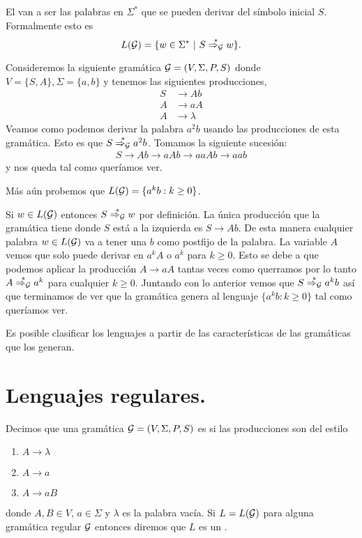 \documentclass[tesis.tex]{subfiles}
\newcommand{\gramatica}{{\cal G} = (V, \Sigma, P, S)}
\newcommand{\deriva}{\overset{*}{\Rightarrow_{\cal G}}}
\newcommand{\lengderivado}{L({\cal G})}
\begin{document}
\begin{deff}
	El  van a ser las palabras en $\Sigma^*$ que se pueden derivar del símbolo inicial $S$. Formalmente esto es
	\[
	L({\cal G}) = \{ w \in \Sigma^* \ | \ S \overset{*}{\Rightarrow_{\cal G}} w   \}.
	\]
\end{deff}
\medskip
\begin{ej}\label{gramatica-regular}
	Consideremos la siguiente gramática ${\cal G} = (V, \Sigma, P, S)$ donde $V = \{ S, A \}, \Sigma = \{ a,b \}$ y tenemos las siguientes producciones,
	\begin{align*}
	S & \to Ab \\
	A & \to aA \\
	A & \to \lambda
	\end{align*}
	Veamos como podemos derivar la palabra $a^2b$ usando las producciones de esta gramática. 
	Esto es que $S \deriva a^2b$.
	Tomamos la siguiente sucesión:
	\begin{align*}
		S \to Ab \to aAb \to aaAb \to aab
	\end{align*} 
	y nos queda tal como queríamos ver.
	
	Más aún probemos que $L({\cal G}) = \{ a^{k}b : k \ge 0 \}$. 
	
	Si $w \in L(\cal G)$ entonces $S \deriva w$ por definición. 
	La única producción que la gramática tiene donde $S$ está a la izquierda es $S \to Ab$. 
	De esta manera cualquier palabra $w \in L(\cal G)$ va a tener una $b$ como postfijo de la palabra. 
	La variable $A$ vemos que solo puede derivar en $a^{k}A$ o $a^{k}$ para $k \ge 0$.
	Esto se debe a que podemos aplicar la producción $A \to aA$ tantas veces como querramos por lo tanto $A \deriva a^k$ para cualquier $k \ge 0$.
	Juntando con lo anterior vemos que $S \deriva a^{k}b$ así que terminamos de ver que la gramática genera al lenguaje $\{a^kb : k \ge 0\}$ tal como queríamos ver.
\end{ej}



Es posible clasificar los lenguajes a partir de las características de las gramáticas que los generan. 

\section{Lenguajes regulares.}

\begin{deff}
	Decimos que una gramática $\gramatica$ es  si las producciones son del estilo
	\begin{enumerate}
		\item $A \to \lambda$
		\item $A \to a$
		\item $A \to a B$
	\end{enumerate}
	donde $A, B \in V$, $a \in \Sigma$ y $\lambda$ es la palabra vacía. 
	Si $L=\lengderivado$ para alguna gramática regular $\cal G$ entonces diremos que $L$ es un . 
\end{deff}
\end{document}
